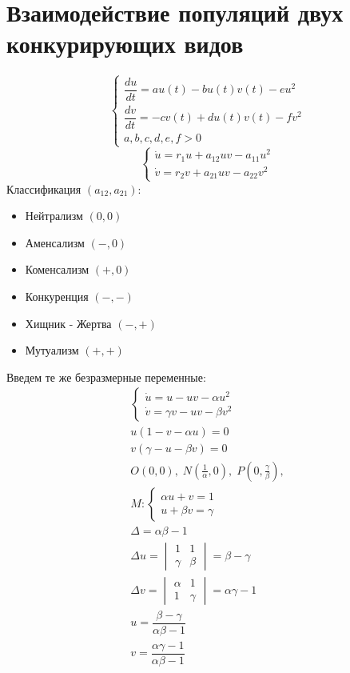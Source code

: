         \section{Взаимодействие популяций двух конкурирующих видов}
          \begin{equation}
         \begin{cases}
         \dfrac{du}{dt} = au(t) - bu(t)v(t) - eu^2 \\[8pt]
         \dfrac{dv}{dt} = -cv(t) + du(t)v(t) - fv^2\\
         a,b,c,d,e,f > 0
         \end{cases}
\end{equation}
\begin{equation}
\begin{cases}
\dot{u} = r_1 u + a_{12} uv - a_{11} u^2\\
\dot{v} = r_2 v + a_{21} uv - a_{22} v^2
\end{cases}
\end{equation}
Классификация $(a_{12}, a_{21})$:
\begin{itemize}
\item Нейтрализм $(0, 0)$
\item Аменсализм $(-, 0)$
\item Коменсализм $(+, 0)$
\item Конкуренция $(-, -)$
\item Хищник - Жертва $(-, +)$
\item Мутуализм $(+, +)$
\end{itemize}
Введем те же безразмерные переменные:
\begin{gather*}
\begin{cases}
\dot{u} = u - uv - \alpha u ^2\\
\dot{v} = \gamma v - uv - \beta v^2
\end{cases}\\
u(1 - v - \alpha u) = 0\\
v(\gamma - u - \beta v) = 0\\
O(0,0), \;
N\left(\frac{1}{\alpha}, 0 \right), \;
P\left(0, \frac{\gamma}{\beta} \right),\\
M: \begin{cases}
\alpha u + v = 1\\
u + \beta v = \gamma
\end{cases}\\
\Delta = \alpha \beta - 1\\
\Delta u = \begin{vmatrix}
1 & 1\\
\gamma & \beta
\end{vmatrix} = \beta - \gamma\\
\Delta v = \begin{vmatrix}
\alpha & 1\\
1 & \gamma
\end{vmatrix} = \alpha \gamma - 1\\
u = \dfrac{\beta - \gamma}{\alpha \beta - 1}\\
v = \dfrac{\alpha \gamma - 1}{\alpha \beta - 1}
\end{gather*}
